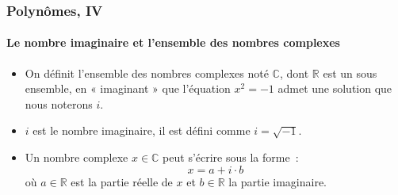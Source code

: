 \documentclass[10pt,notheorems]{beamer}
\theoremstyle{plain}
\theoremstyle{definition} %
\begin{document}
\begin{frame}
  \frametitle{Polynômes, IV}
  \framesubtitle{Le nombre imaginaire et l'ensemble des nombres complexes}
  \hypertarget{slide_polynome_2_imaginaire_1}{}

  \bigskip

  \begin{itemize}

  \item On définit l'ensemble des nombres complexes noté $\mathbb C$, dont $\mathbb R$ est un sous ensemble, en « imaginant » que l'équation $x^2=-1$ admet une solution que nous noterons $i$.\newline

  \item $i$ est le nombre imaginaire, il est défini comme $i = \sqrt{-1}$.\newline

  \item Un nombre complexe $x\in\mathbb C$ peut s'écrire sous la forme~:
    \[
      x = a + i\cdot b
    \]
    où $a\in\mathbb R$ est la partie réelle de $x$ et $b\in\mathbb R$ la partie imaginaire.\newline

  \end{itemize}

  \begin{center}

  \end{center}

\end{frame}
\end{document}
